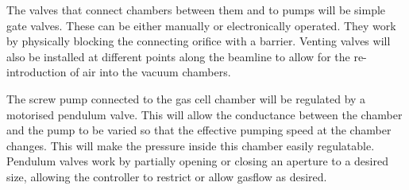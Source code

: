 The valves that connect chambers between them and to pumps will be simple gate valves. These can be either manually or electronically operated. They work by physically blocking the connecting orifice with a barrier. Venting valves will also be installed at different points along the beamline to allow for the re-introduction of air into the vacuum chambers.

The screw pump connected to the gas cell chamber will be regulated by a motorised pendulum valve. This will allow the conductance between the chamber and the pump to be varied so that the effective pumping speed at the chamber changes. This will make the pressure inside this chamber easily regulatable. Pendulum valves work by partially opening or closing an aperture to a desired size, allowing the controller to restrict or allow gasflow as desired.



